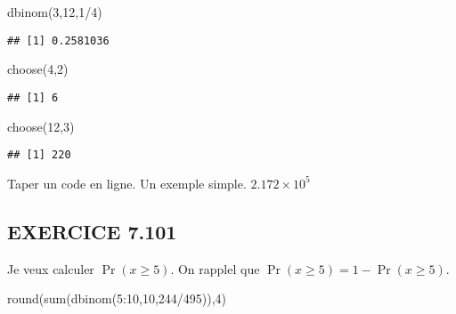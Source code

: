 \documentclass[
]{article}
\newenvironment{Shaded}{\begin{snugshade}}{\end{snugshade}}
\newcommand{\DecValTok}[1]{\textcolor[rgb]{0.00,0.00,0.81}{#1}}
\newcommand{\FunctionTok}[1]{\textcolor[rgb]{0.00,0.00,0.00}{#1}}
\newcommand{\NormalTok}[1]{#1}
\newcommand{\SpecialCharTok}[1]{\textcolor[rgb]{0.00,0.00,0.00}{#1}}
\begin{document}
\begin{Shaded}
\begin{Highlighting}[]
\FunctionTok{dbinom}\NormalTok{(}\DecValTok{3}\NormalTok{,}\DecValTok{12}\NormalTok{,}\DecValTok{1}\SpecialCharTok{/}\DecValTok{4}\NormalTok{)}
\end{Highlighting}
\end{Shaded}

\begin{verbatim}
## [1] 0.2581036
\end{verbatim}

\begin{Shaded}
\begin{Highlighting}[]
\FunctionTok{choose}\NormalTok{(}\DecValTok{4}\NormalTok{,}\DecValTok{2}\NormalTok{)}
\end{Highlighting}
\end{Shaded}

\begin{verbatim}
## [1] 6
\end{verbatim}

\begin{Shaded}
\begin{Highlighting}[]
\FunctionTok{choose}\NormalTok{(}\DecValTok{12}\NormalTok{,}\DecValTok{3}\NormalTok{)}
\end{Highlighting}
\end{Shaded}

\begin{verbatim}
## [1] 220
\end{verbatim}

Taper un code en ligne. Un exemple simple.
\ensuremath{2.172\times 10^{5}}

\hypertarget{exercice-7.101}{%
\subsection{EXERCICE 7.101}\label{exercice-7.101}}

Je veux calculer \(\Pr(x\geq 5 )\). On rapplel que
\(\Pr(x\geq 5 )= 1- \Pr(x\geq 5 )\).

\begin{Shaded}
\begin{Highlighting}[]
\FunctionTok{round}\NormalTok{(}\FunctionTok{sum}\NormalTok{(}\FunctionTok{dbinom}\NormalTok{(}\DecValTok{5}\SpecialCharTok{:}\DecValTok{10}\NormalTok{,}\DecValTok{10}\NormalTok{,}\DecValTok{244}\SpecialCharTok{/}\DecValTok{495}\NormalTok{)),}\DecValTok{4}\NormalTok{)}
\end{Highlighting}
\end{Shaded}
\end{document}
